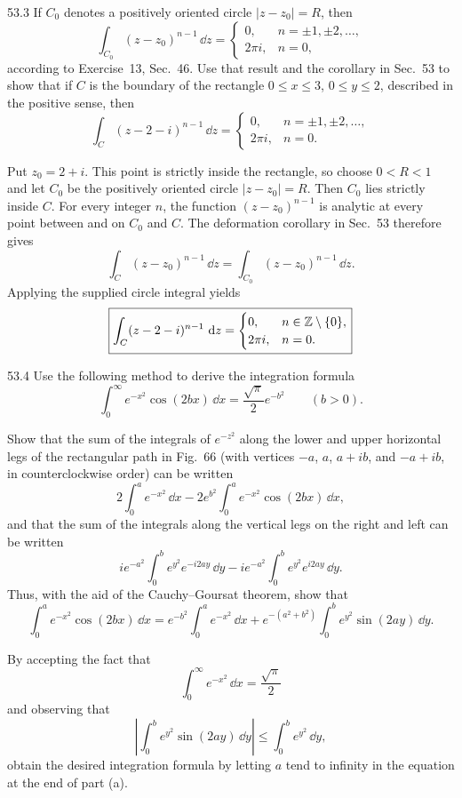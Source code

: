 \documentclass[11pt,oneside]{article}
\begin{document}
\begin{exercise}{53.3}
If $C_0$ denotes a positively oriented circle $|z-z_0|=R$, then
\[
    \int_{C_0}(z-z_0)^{n-1}\,\dd z=
    \begin{cases}
       0, &n=\pm1, \pm2, \ldots, \\
       2\pi i, &n=0,
    \end{cases}
\]
according to Exercise~13, Sec.~46. Use that result and the corollary in Sec.~53 to show that if $C$ is the boundary of the rectangle $0\le x\le3$, $0\le y\le2$, described in the positive sense, then
\[
    \int_C(z-2-i)^{n-1}\,\dd z=
    \begin{cases}
       0, &n=\pm1, \pm2, \ldots, \\
       2\pi i, &n=0.
    \end{cases}
\]
\end{exercise}

\begin{solution}
Put $z_0=2+i$. This point is strictly inside the rectangle, so choose $0<R<1$ and let $C_0$ be the positively oriented circle $|z-z_0|=R$. Then $C_0$ lies strictly inside $C$. For every integer $n$, the function $(z-z_0)^{n-1}$ is analytic at every point between and on $C_0$ and $C$. The deformation corollary in Sec.~53 therefore gives
\[
    \int_C(z-z_0)^{n-1}\,\dd z
    =\int_{C_0}(z-z_0)^{n-1}\,\dd z.
\]
Applying the supplied circle integral yields
\[
    \boxed{\int_C(z-2-i)^{n-1}\,\mathop{}\!\mathrm{d} z=
    \begin{cases}
        0, &n\in\mathbb{Z}\setminus\{0\}, \\
        2\pi i, &n=0.
    \end{cases}}
\]
\end{solution}

\begin{exercise}{53.4}
Use the following method to derive the integration formula
\[
    \int_0^\infty e^{-x^2}\cos(2bx)\,\dd x
    =\frac{\sqrt\pi}{2}e^{-b^2}\qquad(b>0).
\]
\begin{exercisesubparts}
\item Show that the sum of the integrals of $e^{-z^2}$ along the lower and upper horizontal legs of the rectangular path in Fig.~66 (with vertices $-a$, $a$, $a+ib$, and $-a+ib$, in counterclockwise order) can be written
\[
    2\int_0^a e^{-x^2}\,\dd x
    -2e^{b^2}\int_0^a e^{-x^2}\cos(2bx)\,\dd x,
\]
and that the sum of the integrals along the vertical legs on the right and left can be written
\[
    ie^{-a^2}\int_0^b e^{y^2}e^{-i2ay}\,\dd y
    -ie^{-a^2}\int_0^b e^{y^2}e^{i2ay}\,\dd y.
\]
Thus, with the aid of the Cauchy--Goursat theorem, show that
\[
    \int_0^a e^{-x^2}\cos(2bx)\,\dd x
    =e^{-b^2}\int_0^a e^{-x^2}\,\dd x
     +e^{-(a^2+b^2)}\int_0^b e^{y^2}\sin(2ay)\,\dd y.
\]
\item By accepting the fact that
\[
    \int_0^\infty e^{-x^2}\,\dd x=\frac{\sqrt\pi}{2}
\]
and observing that
\[
    \left|\int_0^b e^{y^2}\sin(2ay)\,\dd y\right|
    \le\int_0^b e^{y^2}\,\dd y,
\]
obtain the desired integration formula by letting $a$ tend to infinity in the equation at the end of part (a).
\end{exercisesubparts}
\end{exercise}
\end{document}
